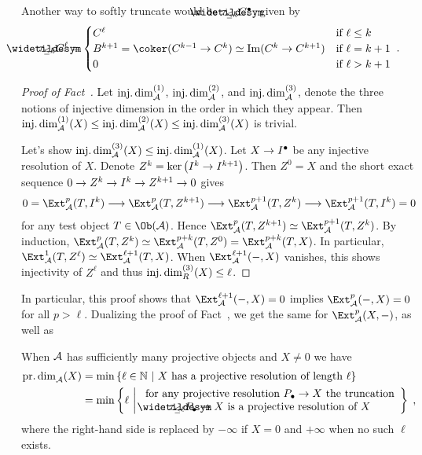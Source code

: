 \documentclass[a4paper,parskip=half,numbers=enddot, DIV=12]{scrreprt}
\begin{document}
Another way to softly truncate would be $\snake{\tau}_{\leq k}C^\bullet$, given by
\begin{align*}
\snake{\tau}_{\leq k}C^\ell=\begin{cases}
C^\ell & \text{if }\ell\leq k\\
B^{k+1}=\coker(C^{k-1}\morphism C^k)\simeq \Im(C^k\morphism C^{k+1}) & \text{if }\ell=k+1\\
0 & \text{if }\ell>k+1
\end{cases}\;.
\end{align*}
\begin{proof}[Proof of Fact~]
	Let $\operatorname{inj.dim}_{\mathcal{A}}^{(1)}$, $\operatorname{inj.dim}_{\mathcal{A}}^{(2)}$, and $\operatorname{inj.dim}_{\mathcal{A}}^{(3)}$,  denote the three notions of injective dimension in the order in which they appear. Then $\operatorname{inj.dim}_{\mathcal{A}}^{(1)}(X)\leq \operatorname{inj.dim}_{\mathcal{A}}^{(2)}(X)\leq \operatorname{inj.dim}_{\mathcal{A}}^{(3)}(X)$ is trivial.
	
	Let's show $\operatorname{inj.dim}_{\mathcal{A}}^{(3)}(X)\leq \operatorname{inj.dim}_{\mathcal{A}}^{(1)}(X)$. Let $X\morphism I^\bullet$ be any injective resolution of $X$. Denote $Z^k=\ker\left(I^k\morphism I^{k+1}\right)$. Then $Z^0=X$ and the short exact sequence $0\morphism Z^k\morphism I^k\morphism Z^{k+1}\morphism 0$ gives
	\begin{align*}
		0=\Ext_\Aa^p(T,I^k)\morphism \Ext_\Aa^p(T,Z^{k+1})\morphism\Ext_\Aa^{p+1}(T,Z^k)\morphism\Ext_\Aa^{p+1}(T,I^k)=0
	\end{align*}
	for any test object $T\in\Ob(\Aa)$. Hence $\Ext_\Aa^p(T,Z^{k+1})\simeq \Ext_\Aa^{p+1}(T,Z^k)$. By induction, $\Ext_\Aa^p(T,Z^k)\simeq \Ext_\Aa^{p+k}(T,Z^0)=\Ext_\Aa^{p+k}(T,X)$. In particular, $\Ext_\Aa^1(T,Z^\ell)\simeq \Ext_\Aa^{\ell+1}(T,X)$. When $\Ext_\Aa^{\ell+1}(-,X)$ vanishes, this shows injectivity of $Z^\ell$ and thus $\operatorname{inj.dim}_R^{(3)}(X)\leq \ell$.
\end{proof}
In particular, this proof shows that $\Ext_\Aa^{\ell+1}(-,X)=0$ implies $\Ext_\Aa^p(-,X)=0$ for all $p>\ell$. Dualizing the proof of Fact~, we get the same for $\Ext_\Aa^p(X,-)$, as well as 
\begin{fact}
	When $\mathcal{A}$ has sufficiently many projective objects and $X\neq 0$ we have
	\begin{align*}
	\pdim_\Aa(X)&=\min\left\{\ell\in\IN\st X\text{ has a projective resolution of length }\ell\right\}\\
	&=	\min\left\{\ell\st\begin{array}{c}
	\text{for any projective resolution }P_\bullet\morphism X\text{ the truncation}\\
	\snake{\tau}_{\leq\ell}P_\bullet\morphism X\text{ is a projective resolution of }X
	\end{array}
	\right\}\;,
	\end{align*}
	where the right-hand side is replaced by $-\infty$ if $X=0$ and $+\infty$ when no such $\ell$ exists.
\end{fact}
\end{document}
